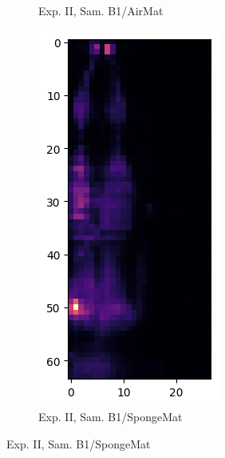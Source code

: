 \documentclass[9pt]{beamer}
\begin{document}
{\begin{figure}[!ht]
\begin{subfigure}[t]{0.3\textwidth}
        \caption{\scriptsize Exp. II, Sam. B1/AirMat}
      \end{subfigure}
      \begin{subfigure}[t]{0.33\textwidth}
        \centering
        \includegraphics[height=0.45\textheight]{./EII_SpongeMat_B1.png}
        \caption{\scriptsize Exp. II, Sam. B1/SpongeMat}
      \end{subfigure}
    \end{figure}

}
\end{document}
